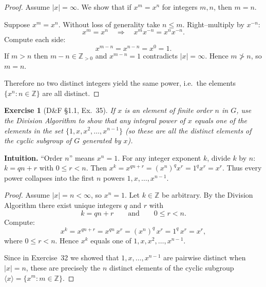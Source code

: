 \documentclass[12pt]{article}
\newtheorem{exercise}[theorem]{Exercise}
\theoremstyle{definition}
\begin{document}
\dotfill

\begin{proof}
Assume $|x|=\infty$. We show that if $x^m=x^n$ for integers $m,n$, then $m=n$.

\dotfill

\noindent
Suppose $x^m=x^n$. Without loss of generality take $n\le m$. Right–multiply by $x^{-n}$:
\[
x^m=x^n
\quad\Longrightarrow\quad
x^m x^{-n}=x^n x^{-n}.
\]
Compute each side:
\[
x^{m-n}=x^{n-n}=x^0=1.
\]
If $m>n$ then $m-n\in\mathbb{Z}_{>0}$ and $x^{m-n}=1$ contradicts $|x|=\infty$. Hence $m\not>n$, so $m=n$.

\dotfill

\noindent
Therefore no two distinct integers yield the same power, i.e.\ the elements $\{x^n:n\in\mathbb{Z}\}$ are all distinct.
\end{proof}

\newpage

\begin{exercise}[D\&F §1.1, Ex.~35]
If $x$ is an element of finite order $n$ in $G$, use the Division Algorithm to show that any
integral power of $x$ equals one of the elements in the set $\{1,x,x^2,\ldots,x^{n-1}\}$
(so these are all the distinct elements of the cyclic subgroup of $G$ generated by $x$).
\end{exercise}

\dotfill

\noindent
\textbf{Intuition.}
“Order $n$” means $x^n=1$. For any integer exponent $k$, divide $k$ by $n$:
$k=qn+r$ with $0\le r<n$. Then $x^k=x^{qn+r}=(x^n)^q x^r=1^q x^r=x^r$.
Thus every power collapses into the first $n$ powers $1,x,\dots,x^{n-1}$.

\dotfill

\begin{proof}
Assume $|x|=n<\infty$, so $x^n=1$. Let $k\in\mathbb{Z}$ be arbitrary.
By the Division Algorithm there exist unique integers $q$ and $r$ with
\[
k=qn+r \qquad\text{and}\qquad 0\le r<n.
\]
Compute:
\[
x^k = x^{qn+r} = x^{qn}\,x^{r} = (x^n)^q\,x^r = 1^q\,x^r = x^r,
\]
where $0\le r<n$. Hence $x^k$ equals one of $1,x,x^2,\ldots,x^{n-1}$.

Since in Exercise~32 we showed that $1,x,\ldots,x^{n-1}$ are pairwise distinct
when $|x|=n$, these are precisely the $n$ distinct elements of the cyclic subgroup
$\langle x\rangle=\{x^m:m\in\mathbb{Z}\}$. 
\end{proof}

\newpage
\end{document}
